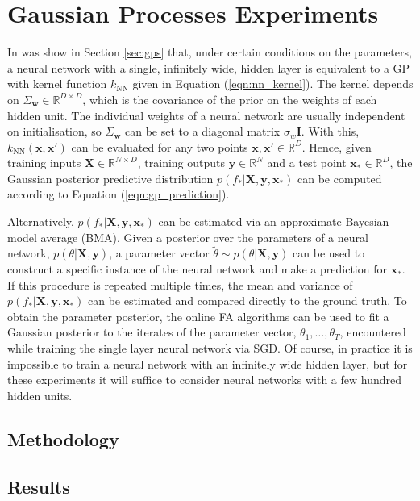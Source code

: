 \documentclass[msc,deptreport.inf]{infthesis} %
\newcommand{\matr}[1]{\mathbf{#1}}
\newcommand{\R}{\mathbb R}
\begin{document}
\chapter{Gaussian Processes Experiments}

In was show in Section \ref{sec:gps} that, under certain conditions on the parameters, a neural network with a single, infinitely wide, hidden layer is equivalent to a GP with kernel function $k_{\text{NN}}$ given in Equation (\ref{eqn:nn_kernel}). The kernel depends on $\Sigma_{\matr{w}} \in \R^{D \times D}$, which is the covariance of the prior on the weights of each hidden unit. The individual weights of a neural network are usually independent on initialisation, so $\Sigma_{\matr{w}}$ can be set to a diagonal matrix $\sigma_w \matr{I}$. With this, $k_{\text{NN}}(\matr{x}, \matr{x}')$ can be evaluated for any two points $\matr{x}, \matr{x}' \in \R^D$. Hence, given training inputs $\matr{X} \in \R^{N\times D}$, training outputs $\matr{y} \in \R^N$ and a test point $\matr{x}_{*} \in \R^D$, the Gaussian posterior predictive distribution $p(f_{*} | \matr{X}, \matr{y}, \matr{x}_{*})$ can be computed according to Equation (\ref{eqn:gp_prediction}). 

Alternatively, $p(f_{*} | \matr{X}, \matr{y}, \matr{x}_{*})$ can be estimated via an approximate Bayesian model average (BMA). Given a posterior over the parameters of a neural network, $p(\theta |  \matr{X}, \matr{y})$, a parameter vector $\tilde{\theta} \sim p(\theta |  \matr{X}, \matr{y})$ can be used to construct a specific instance of the neural network and make a prediction for $\matr{x}_{*}$. If this procedure is repeated multiple times, the mean and variance of $p(f_{*} | \matr{X}, \matr{y}, \matr{x}_{*})$ can be estimated and compared directly to the ground truth. To obtain the parameter posterior, the online FA algorithms can be used to fit a Gaussian posterior to the iterates of the parameter vector, $\theta_1, \dots, \theta_T$, encountered while training the single layer neural network via SGD. Of course, in practice it is impossible to train a neural network with an infinitely wide hidden layer, but for these experiments it will suffice to consider neural networks with a few hundred hidden units. 


\section{Methodology}

\section{Results}
\end{document}
